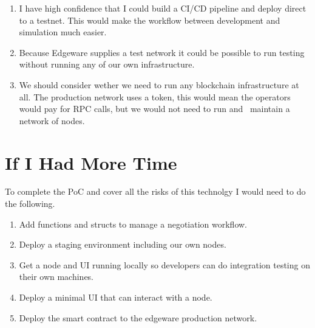 \begin{enumerate}
    \item I have high confidence that I could build a CI/CD pipeline and deploy direct to a testnet.
        This would make the workflow between development and simulation much easier.
    \item Because Edgeware supplies a test network it could be possible
        to run testing without running any of our own infrastructure.
    \item We should consider wether we need to run any blockchain infrastructure
        at all. The production network uses a token, this would mean the 
        operators would pay for RPC calls, but we would not need to run and \
        maintain a network of nodes.
\end{enumerate}


\section{If I Had More Time}

To complete the PoC and cover all the risks of this technolgy I would need to do the following.

\begin{enumerate}
    \item Add functions and structs to manage a negotiation workflow.
    \item Deploy a staging environment including our own nodes.
    \item Get a node and UI running locally so developers can do integration 
    testing on their own machines.
    \item Deploy a minimal UI that can interact with a node.
    \item Deploy the smart contract to the edgeware production network.
\end{enumerate}